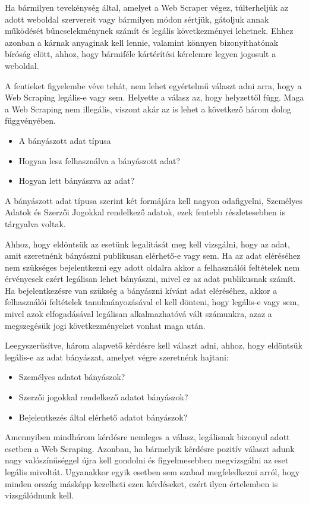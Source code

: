Ha bármilyen tevekénység által, amelyet a Web Scraper végez, túlterheljük az adott weboldal szervereit vagy bármilyen módon sértjük, gátoljuk annak működését bűncselekménynek számít és legális következményei lehetnek. Ehhez azonban a kárnak anyaginak kell lennie, valamint könnyen bizonyíthatónak bíróság elött, ahhoz, hogy bármiféle kártérítési kérelemre legyen jogosult a weboldal\cite{krotov2018legality}. 


A fentieket figyelembe véve tehát, nem lehet egyértelmű választ adni arra, hogy a Web Scraping legális-e vagy sem. Helyette a válasz az, hogy helyzettől függ. Maga a Web Scraping nem illegális, viszont akár az is lehet a következő három dolog függvényében\cite{isWSLegal}. 

\begin{itemize}
    \item A bányászott adat típusa
    \item Hogyan lesz felhasználva a bányászott adat?
    \item Hogyan lett bányászva az adat?
\end{itemize}

A bányászott adat típusa szerint két formájára kell nagyon odafigyelni, Személyes Adatok és Szerzői Jogokkal rendelkező adatok, ezek fentebb részletesebben is tárgyalva voltak.

Ahhoz, hogy eldöntsük az esetünk legalitását meg kell vizsgálni, hogy az adat, amit szeretnénk bányászni publikusan elérhető-e vagy sem. Ha az adat eléréséhez nem szükséges bejelentkezni egy adott oldalra akkor a felhasználói feltételek nem érvényesek ezért legálisan lehet bányászni, mivel ez az adat publikusnak számít. Ha bejelentkezésre van szükség a bányászni kívánt adat eléréséhez, akkor a felhasználói feltételek tanulmányozásával el kell dönteni, hogy legális-e vagy sem, mivel azok elfogadásával legálisan alkalmazhatóvá vált számunkra, azaz a megszegésük jogi következményeket vonhat maga után.

Leegyszerűsítve, három alapvető kérdésre kell választ adni, ahhoz, hogy eldöntsük legális-e az adat bányászat, amelyet végre szeretnénk hajtani: 
\begin{itemize}
    \item Személyes adatot bányászok?
    \item Szerzői jogokkal rendelkező adatot bányászok?
    \item Bejelentkezés által elérhető adatot bányászok?
\end{itemize}

Amennyiben mindhárom kérdésre nemleges a válasz, legálisnak bizonyul adott esetben a Web Scraping. Azonban, ha bármelyik kérdésre pozitív választ adunk nagy valószínűséggel újra kell gondolni és figyelmesebben megvizsgálni az eset legális mivoltát. Ugyanakkor egyik esetben sem szabad megfeledkezni arról, hogy minden ország másképp kezelheti ezen kérdéseket, ezért ilyen értelemben is vizsgálódnunk kell.
